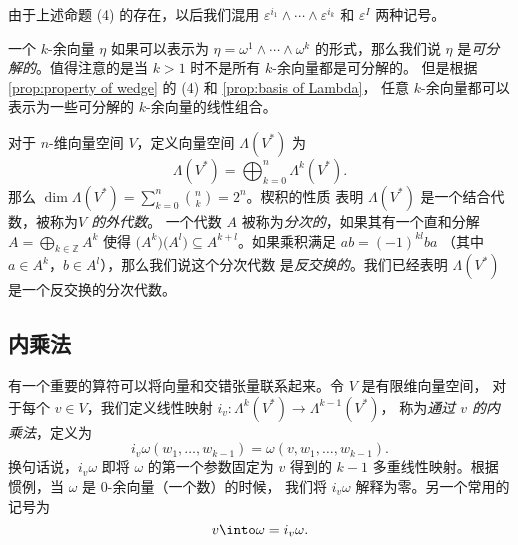由于上述命题 (4) 的存在，以后我们混用 $\varepsilon^{i_1} \wedge\cdots\wedge\varepsilon^{i_k}$
和 $\varepsilon^I$ 两种记号。

一个 $k$-余向量 $\eta$ 如果可以表示为 $\eta=\omega^1\wedge\cdots\wedge\omega^k$
的形式，那么我们说 $\eta$ 是\emph{可分解的}。值得注意的是当 $k>1$ 时不是所有 $k$-余向量都是可分解的。
但是根据 \autoref{prop:property of wedge} 的 (4) 和 \autoref{prop:basis of Lambda}，
任意 $k$-余向量都可以表示为一些可分解的 $k$-余向量的线性组合。

对于 $n$-维向量空间 $V$，定义向量空间 $\Lambda(V^*)$ 为
\[
  \Lambda(V^*)=\bigoplus_{k=0}^n\Lambda^k(V^*).  
\]
那么 $\dim\Lambda(V^*)=\sum_{k=0}^n \binom{n}{k}=2^n$。楔积的性质
表明 $\Lambda(V^*)$ 是一个结合代数，被称为\emph{$V$ 的外代数}。
一个代数 $A$ 被称为\emph{分次的}，如果其有一个直和分解 $A=\bigoplus_{k\in \mathbb{Z}}A^k$
使得 $\bigl(A^k\bigr)\bigl(A^l\bigr)\subseteq A^{k+l}$。如果乘积满足
$ab=(-1)^{kl}ba$ （其中 $a\in A^k$，$b\in A^l$），那么我们说这个分次代数
是\emph{反交换的}。我们已经表明 $\Lambda(V^*)$ 是一个反交换的分次代数。

\subsection{内乘法}

有一个重要的算符可以将向量和交错张量联系起来。令 $V$ 是有限维向量空间，
对于每个 $v\in V$，我们定义线性映射 $i_v:\Lambda^k(V^*)\to\Lambda^{k-1}(V^*)$，
称为\emph{通过 $v$ 的内乘法}，定义为
\[
  i_v\omega(w_1,\dots,w_{k-1})=\omega(v,w_1,\dots,w_{k-1}).
\]
换句话说，$i_v\omega$ 即将 $\omega$ 的第一个参数固定为 $v$ 得到的
$k-1$ 多重线性映射。根据惯例，当 $\omega$ 是 $0$-余向量（一个数）的时候，
我们将 $i_v\omega$ 解释为零。另一个常用的记号为
\[
  v\into\omega=i_v\omega.  
\]


